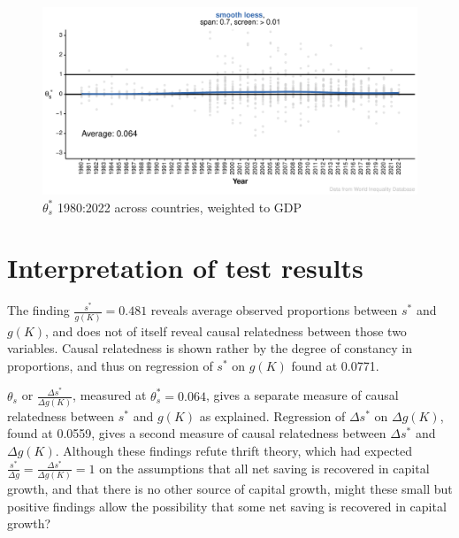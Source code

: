 \documentclass[a4paper,fleqn]{latex_styles/cas-sc}
\begin{document}
\FloatBarrier
\begin{figure}[pos=H]
    \centering
        \includegraphics[width=1\textwidth]{./figure-pdf/fig-si_plots-1.pdf}
    \captionsetup{justification=centering}
    \caption{\(\theta_s^*\) 1980:2022 across countries, weighted to GDP}
    \label{fig-si_plots}
\end{figure}
%
\FloatBarrier

\FloatBarrier

\section{Interpretation of test results\label{interpretation-of-test-results}}


The finding \(\frac{s^*}{g(K)} = 0.481\) reveals average observed proportions between \(s^*\) and \(g(K)\), and does not of itself reveal causal relatedness between those two variables. Causal relatedness is shown rather by the degree of constancy in proportions, and thus on regression of \(s^*\) on \(g(K)\) found at 0.0771.

\(\theta_s\) or \(\frac{\Delta s^*}{\Delta g(K)}\), measured at \(\theta_s^* = 0.064\), gives a separate measure of causal relatedness between \(s^*\) and \(g(K)\) as explained. Regression of \(\Delta s^*\) on \(\Delta g(K)\), found at 0.0559, gives a second measure of causal relatedness between \(\Delta s^*\) and \(\Delta g(K)\). Although these findings refute thrift theory, which had expected \(\frac{s^*}{\Delta g} = \frac{\Delta s^*}{\Delta g(K)} = 1\) on the assumptions that all net saving is recovered in capital growth, and that there is no other source of capital growth, might these small but positive findings allow the possibility that some net saving is recovered in capital growth?
\end{document}
